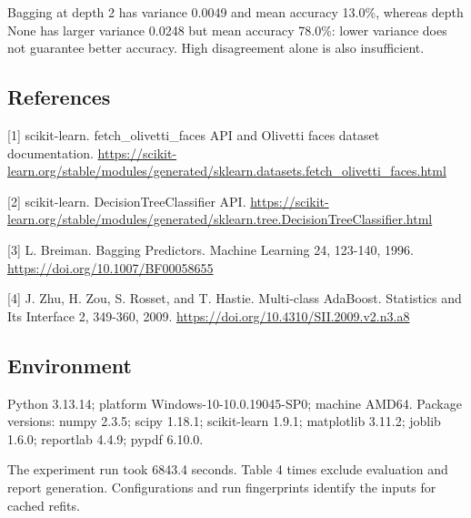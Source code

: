 \documentclass[10pt,twocolumn,letterpaper]{article}
\begin{document}
Bagging at depth 2 has variance 0.0049 and mean accuracy 13.0\%, whereas depth None has larger variance 0.0248 but mean accuracy 78.0\%: lower variance does not guarantee better accuracy. High disagreement alone is also insufficient.

\subsection*{References}
[1] scikit-learn. fetch\_olivetti\_faces API and Olivetti faces dataset documentation. \url{https://scikit-learn.org/stable/modules/generated/sklearn.datasets.fetch_olivetti_faces.html}

[2] scikit-learn. DecisionTreeClassifier API. \url{https://scikit-learn.org/stable/modules/generated/sklearn.tree.DecisionTreeClassifier.html}

[3] L. Breiman. Bagging Predictors. Machine Learning 24, 123-140, 1996. \url{https://doi.org/10.1007/BF00058655}

[4] J. Zhu, H. Zou, S. Rosset, and T. Hastie. Multi-class AdaBoost. Statistics and Its Interface 2, 349-360, 2009. \url{https://doi.org/10.4310/SII.2009.v2.n3.a8}

\subsection*{Environment}
Python 3.13.14; platform Windows-10-10.0.19045-SP0; machine AMD64. Package versions: numpy 2.3.5; scipy 1.18.1; scikit-learn 1.9.1; matplotlib 3.11.2; joblib 1.6.0; reportlab 4.4.9; pypdf 6.10.0.

The experiment run took 6843.4 seconds. Table 4 times exclude evaluation and report generation. Configurations and run fingerprints identify the inputs for cached refits.
\end{document}
